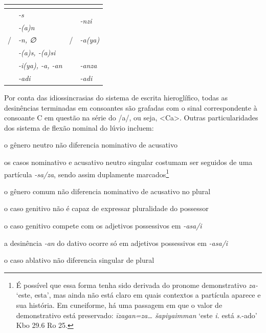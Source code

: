 \begin{center}
	\begin{tabular}[c]{llll}
		\toprule
		                      & \Sg{}\emph{}             &                       & \Pl{}\emph{}                   \\
		\midrule
		\Nom{} \Com{}         & \emph{-s}                & \Nom{} \Com{}         & \multirow{2}{4em}{\emph{-nzi}} \\
		\Acu{} \Com{}         & \emph{-{(a)}n}           & \Acu{} \Com{}         &                                \\
		\Nom{}/\Acu{} \Neut{} & \emph{-n, ∅}             & \Nom{}/\Acu{} \Neut{} & \emph{-a{(ya)}}                \\
		\Gen{}                & \emph{-{(a)}s, -{(a)}si} &                       &                                \\
		\Dat{}                & \emph{-i{(ya)}, -a, -an} & \Dat{}                & \emph{-anza}                   \\
		\Abl{}                & \emph{-adi}              & \Abl{}                & \emph{-adi}                    \\
		\bottomrule
	\end{tabular}
\end{center}

Por conta das idiossincrasias do sistema de escrita hieroglífico, todas as
desinências terminadas em consoantes são grafadas com o sinal correspondente à
consoante C em questão na série do /a/, ou seja, <Ca>.
Outras particularidades dos sistema de flexão nominal do lúvio incluem:
\begin{compactitem}
	\item o gênero neutro não diferencia nominativo de acusativo
	\item os casos nominativo e acusativo neutro singular costumam ser seguidos de
	uma partícula \emph{-sa\slash{}za}, sendo assim duplamente
	marcados\footnote{É possível que essa forma tenha sido derivada do pronome
		demonstrativo \emph{za-} `este, esta', mas ainda não está claro em quais
		contextos a partícula aparece e sua história. Em cuneiforme, há uma passagem
		em que o valor de demonstrativo está preservado: \emph{īzagan=za\ldots{}
			šapiyaimman} `este \emph{i.} está \emph{s.}-ado' Kbo 29.6 Ro 25.}
	\item o gênero comum não diferencia nominativo de acusativo no plural
	\item o caso genitivo não é capaz de expressar pluralidade do possessor
	\item o caso genitivo compete com os adjetivos possessivos em
	\emph{-asa\slash{}i}
	\item a desinência \emph{-an} do dativo ocorre só em adjetivos possessivos
	em \emph{-asa\slash{}i}
	\item o caso ablativo não diferencia singular de plural
\end{compactitem}

